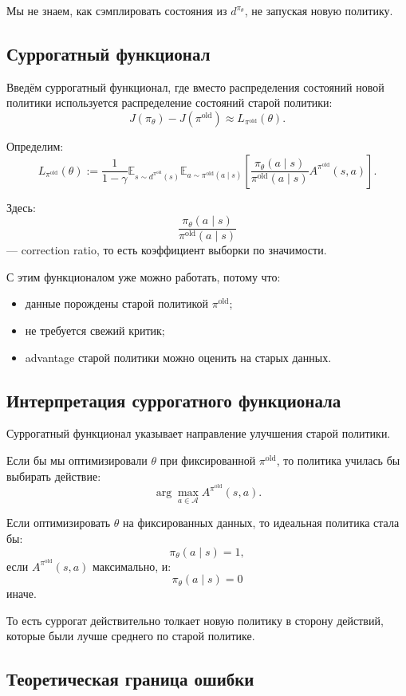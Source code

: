 \documentclass[12pt,a4paper]{article}
\begin{document}
Мы не знаем, как сэмплировать состояния из $d^{\pi_\theta}$, не запуская новую политику.

\subsection{Суррогатный функционал}

Введём суррогатный функционал, где вместо распределения состояний новой политики используется распределение состояний старой политики:
\[
J(\pi_\theta)
-
J(\pi^{\mathrm{old}})
\approx
L_{\pi^{\mathrm{old}}}(\theta).
\]

Определим:
\[
L_{\pi^{\mathrm{old}}}(\theta)
:=
\frac{1}{1-\gamma}
\mathbb E_{s\sim d^{\pi^{\mathrm{old}}}(s)}
\mathbb E_{a\sim\pi^{\mathrm{old}}(a\mid s)}
\left[
\frac{
\pi_\theta(a\mid s)
}{
\pi^{\mathrm{old}}(a\mid s)
}
A^{\pi^{\mathrm{old}}}(s,a)
\right].
\]

Здесь:
\[
\frac{
\pi_\theta(a\mid s)
}{
\pi^{\mathrm{old}}(a\mid s)
}
\]
--- correction ratio, то есть коэффициент выборки по значимости.

С этим функционалом уже можно работать, потому что:
\begin{itemize}
    \item данные порождены старой политикой $\pi^{\mathrm{old}}$;
    \item не требуется свежий критик;
    \item advantage старой политики можно оценить на старых данных.
\end{itemize}

\subsection{Интерпретация суррогатного функционала}

Суррогатный функционал указывает направление улучшения старой политики.

Если бы мы оптимизировали $\theta$ при фиксированной $\pi^{\mathrm{old}}$, то политика училась бы выбирать действие:
\[
\arg\max_{a\in\mathcal A}
A^{\pi^{\mathrm{old}}}(s,a).
\]

Если оптимизировать $\theta$ на фиксированных данных, то идеальная политика стала бы:
\[
\pi_\theta(a\mid s)=1,
\]
если $A^{\pi^{\mathrm{old}}}(s,a)$ максимально, и:
\[
\pi_\theta(a\mid s)=0
\]
иначе.

То есть суррогат действительно толкает новую политику в сторону действий, которые были лучше среднего по старой политике.

\subsection{Теоретическая граница ошибки}
\end{document}
